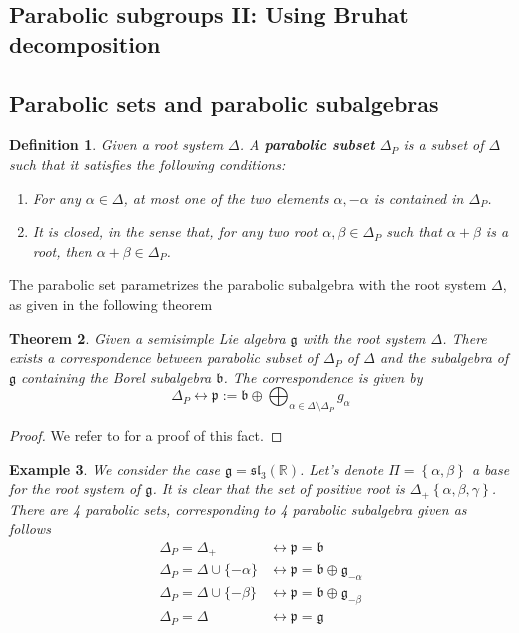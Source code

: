 \documentclass[12pt]{article} %
\newtheorem{definition}{Definition}[section]
\newtheorem{theorem}[definition]{Theorem}
\newtheorem{example}[definition]{Example}
\begin{document}
\subsection{Parabolic subgroups II: Using Bruhat decomposition}

\subsection{Parabolic sets and parabolic subalgebras}
\begin{definition}
    Given a root system $\Delta$. A \textbf{parabolic subset} $\Delta_P$ is a subset of $\Delta$ such that 
    it satisfies the following conditions:
    \begin{enumerate}
        \item For any $\alpha \in \Delta$, at most one of the two elements $\alpha, - \alpha$ is contained in $\Delta_P$.
        \item It is closed, in the sense that, for any two root $\alpha,\beta \in \Delta_P$ such that $\alpha+\beta$ is a root, then $\alpha+\beta \in \Delta_P$.
    \end{enumerate}
\end{definition}
The parabolic set parametrizes the parabolic subalgebra with the root system $\Delta$, as given in the following theorem
\begin{theorem}
    Given a semisimple Lie algebra $\mathfrak{g}$ with the root system $\Delta$. There exists a correspondence between 
    parabolic subset of $\Delta_P$ of $\Delta$ and the subalgebra of $\mathfrak{g}$ containing the 
    Borel subalgebra $\mathfrak{b}$. The correspondence is given by 
    \[ \Delta_P \longleftrightarrow \mathfrak{p}:= \mathfrak{b}\oplus \bigoplus_{\alpha \in \Delta \setminus \Delta_P} g_{\alpha}\]
\end{theorem}
\begin{proof}
    We refer to \cite{} for a proof of this fact.
\end{proof}
\begin{example}
    We consider the case $\mathfrak{g} = \mathfrak{sl}_3(\mathbb{R})$. Let's denote 
    $\Pi = \left\lbrace \alpha,\beta\right\rbrace$ a base for the root system of $\mathfrak{g}$. It is clear that 
    the set of positive root is $\Delta_+\left\lbrace \alpha,\beta,\gamma \right\rbrace$. There are 
    4 parabolic sets, corresponding to 4 parabolic subalgebra given as follows
    \begin{align*}
        \Delta_P = \Delta_+ &\longleftrightarrow \mathfrak{p} = \mathfrak{b}\\
        \Delta_{P} =\Delta \cup \{-\alpha\} &\longleftrightarrow \mathfrak{p} = \mathfrak{b} \oplus \mathfrak{g}_{-\alpha}\\
        \Delta_{P}= \Delta \cup \{-\beta\} &\longleftrightarrow \mathfrak{p} = \mathfrak{b} \oplus \mathfrak{g}_{-\beta}\\
        \Delta_P= \Delta &\longleftrightarrow \mathfrak{p} = \mathfrak{g}
    \end{align*}
\end{example}
\end{document}
